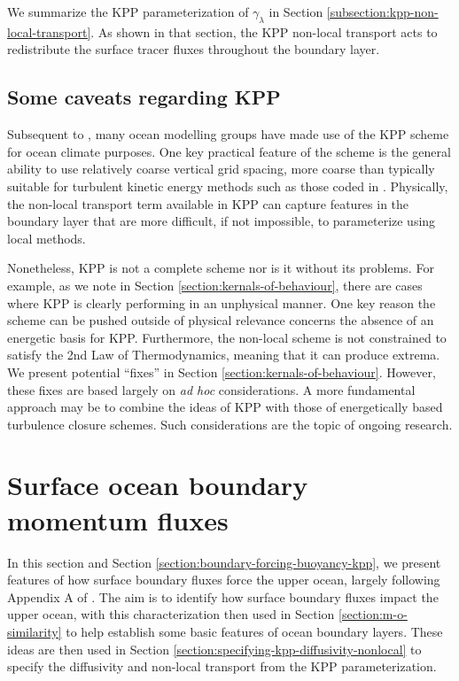 We summarize the KPP parameterization of $\gamma_{\lambda}$ in Section
\ref{subsection:kpp-non-local-transport}.  As shown in that section,
the KPP non-local transport acts to redistribute the surface tracer
fluxes throughout the boundary layer.  

\subsection{Some caveats regarding KPP}
\label{subsection:caveats-for-kpp}

Subsequent to \cite{LargeKPP}, many ocean modelling groups have made
use of the KPP scheme for ocean climate purposes.  One key practical
feature of the scheme is the general ability to use relatively coarse
vertical grid spacing, more coarse than typically suitable for
turbulent kinetic energy methods such as those coded in \cite{GOTM}.
Physically, the non-local transport term available in KPP can capture
features in the boundary layer that are more difficult, if not
impossible, to parameterize using local methods.

Nonetheless, KPP is not a complete scheme nor is it without its
problems.  For example, as we note in Section
\ref{section:kernals-of-behaviour}, there are cases where KPP is
clearly performing in an unphysical manner.  One key reason the scheme
can be pushed outside of physical relevance concerns the absence of an
energetic basis for KPP.  Furthermore, the non-local scheme is not
constrained to satisfy the 2nd Law of Thermodynamics, meaning that it
can produce extrema.  We present potential ``fixes'' in Section
\ref{section:kernals-of-behaviour}.  However, these fixes are based
largely on {\it ad hoc} considerations.  A more fundamental approach
may be to combine the ideas of KPP with those of energetically based
turbulence closure schemes.  Such considerations are the topic of
ongoing research.


\section{Surface ocean boundary momentum fluxes}
\label{section:boundary-forcing-momentum-kpp}

In this section and Section
\ref{section:boundary-forcing-buoyancy-kpp}, we present features of
how surface boundary fluxes force the upper ocean, largely following
Appendix A of \cite{LargeKPP}.  The aim is to identify how surface
boundary fluxes impact the upper ocean, with this characterization
then used in Section \ref{section:m-o-similarity} to help establish
some basic features of ocean boundary layers.  These ideas are then
used in Section \ref{section:specifying-kpp-diffusivity-nonlocal} to
specify the diffusivity and non-local transport from the KPP
parameterization.

